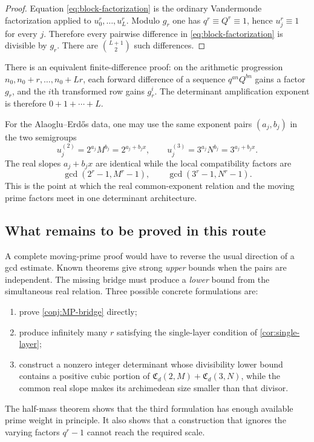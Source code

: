 \documentclass[11pt]{article}
\theoremstyle{definition}
\theoremstyle{remark}
\newcommand{\AEname}{Alaoglu--Erd\H{o}s}
\begin{document}
\begin{proof}
Equation \eqref{eq:block-factorization} is the ordinary Vandermonde
factorization applied to $u_0^r,\ldots,u_L^r$.  Modulo $g_r$ one has
$q^r\equiv Q^r\equiv1$, hence $u_j^r\equiv1$ for every $j$.  Therefore every
pairwise difference in \eqref{eq:block-factorization} is divisible by $g_r$.
There are $\binom{L+1}{2}$ such differences.
\end{proof}

There is an equivalent finite-difference proof: on the arithmetic progression
$n_0,n_0+r,\ldots,n_0+Lr$, each forward difference of a sequence
$q^{an}Q^{bn}$ gains a factor $g_r$, and the $i$th transformed row gains
$g_r^i$.  The determinant amplification exponent is therefore
$0+1+\cdots+L$.

For the \AEname{} data, one may use the same exponent pairs $(a_j,b_j)$ in the
two semigroups
\[
 u_j^{(2)}=2^{a_j}M^{b_j}=2^{a_j+b_jx},
 \qquad
 u_j^{(3)}=3^{a_j}N^{b_j}=3^{a_j+b_jx}.
\]
The real slopes $a_j+b_jx$ are identical while the local compatibility
factors are
\[
 \gcd(2^r-1,M^r-1),\qquad
 \gcd(3^r-1,N^r-1).
\]
This is the point at which the real common-exponent relation and the moving
prime factors meet in one determinant architecture.

\subsection{What remains to be proved in this route}

A complete moving-prime proof would have to reverse the usual direction of a
gcd estimate.  Known theorems give strong \emph{upper} bounds when the pairs
are independent.  The missing bridge must produce a \emph{lower} bound from
the simultaneous real relation.  Three possible concrete formulations are:
\begin{enumerate}
 \item prove \cref{conj:MP-bridge} directly;
 \item produce infinitely many $r$ satisfying the single-layer condition of
       \cref{cor:single-layer};
 \item construct a nonzero integer determinant whose divisibility lower bound
       contains a positive cubic portion of
       $\mathfrak C_d(2,M)+\mathfrak C_d(3,N)$, while the common real slope
       makes its archimedean size smaller than that divisor.
\end{enumerate}
The half-mass theorem shows that the third formulation has enough available
prime weight in principle.  It also shows that a construction that ignores
the varying factors $q^r-1$ cannot reach the required scale.
\end{document}
